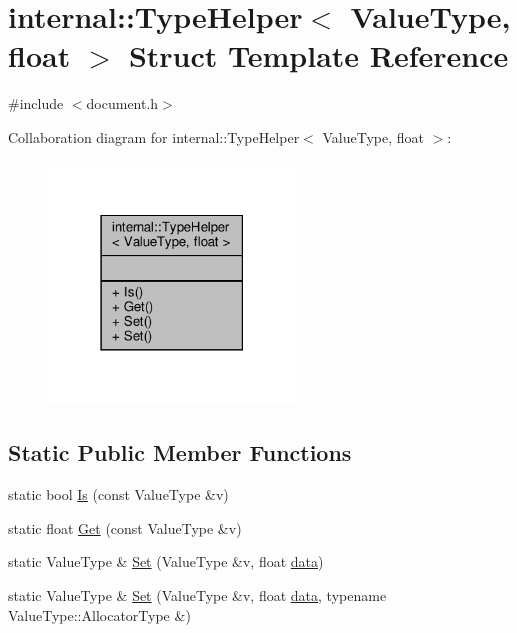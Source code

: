 \hypertarget{structinternal_1_1TypeHelper_3_01ValueType_00_01float_01_4}{}\section{internal\+:\+:Type\+Helper$<$ Value\+Type, float $>$ Struct Template Reference}
\label{structinternal_1_1TypeHelper_3_01ValueType_00_01float_01_4}


{\ttfamily \#include $<$document.\+h$>$}



Collaboration diagram for internal\+:\+:Type\+Helper$<$ Value\+Type, float $>$\+:
\nopagebreak
\begin{figure}[H]
\begin{center}
\leavevmode
\includegraphics[width=186pt]{structinternal_1_1TypeHelper_3_01ValueType_00_01float_01_4__coll__graph}
\end{center}
\end{figure}
\subsection*{Static Public Member Functions}
\begin{DoxyCompactItemize}
\item 
static bool \hyperlink{structinternal_1_1TypeHelper_3_01ValueType_00_01float_01_4_a1108488a02868bb91c3c14f4598bbebc}{Is} (const Value\+Type \&v)
\item 
static float \hyperlink{structinternal_1_1TypeHelper_3_01ValueType_00_01float_01_4_aa681e0d25878a7a770b0be82322b435a}{Get} (const Value\+Type \&v)
\item 
static Value\+Type \& \hyperlink{structinternal_1_1TypeHelper_3_01ValueType_00_01float_01_4_a28318c2063421cf18dfa23d16352a3b8}{Set} (Value\+Type \&v, float \hyperlink{imgui__impl__opengl3__loader_8h_abd87654504355b4c1bb002dcb1d4d16a}{data})
\item 
static Value\+Type \& \hyperlink{structinternal_1_1TypeHelper_3_01ValueType_00_01float_01_4_a3a0d8783f6228504058c427a16687bdf}{Set} (Value\+Type \&v, float \hyperlink{imgui__impl__opengl3__loader_8h_abd87654504355b4c1bb002dcb1d4d16a}{data}, typename Value\+Type\+::\+Allocator\+Type \&)
\end{DoxyCompactItemize}


